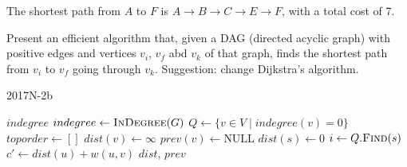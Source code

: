 {The shortest path from $A$ to $F$ is $A \rightarrow B \rightarrow C \rightarrow E \rightarrow F$, with a total cost of 7.

\newpage
{}
Present an efficient algorithm that, given a DAG (directed acyclic graph) with positive edges and vertices $v_i$, $v_f$ abd $v_k$ of that graph, finds the shortest path from $v_i$ to $v_f$ going through $v_k$. Suggestion: change Dijkstra's algorithm.

\ansseparator

\begin{algorithm}[H]
    \caption{2017N-2b}
    \begin{algorithmic}[1]
            \EndFor
            \EndFor
            \State \Return $indegree$
        \EndFunction
            \State $indegree \gets \Call{InDegree}{G}$
            \State $Q \gets \{v \in V \mid indegree(v) = 0\}$
            \State $toporder \gets []$
                    \EndIf
                \EndFor
            \EndWhile
        \EndFunction
                \State $dist(v) \gets \infty$
                \State $prev(v) \gets \text{NULL}$
            \EndFor
            \State $dist(s) \gets 0$
            \State $i \gets Q.\Call{Find}{s}$
                \EndIf
                    \State $c' \gets dist(u) + w(u, v)$
                    \EndIf
                \EndFor
            \EndWhile
            \EndIf
            \EndWhile
            \State \Return $dist$, $prev$
        \EndFunction
            \State {}
        \EndFunction
    \end{algorithmic}
\end{algorithm}

}
